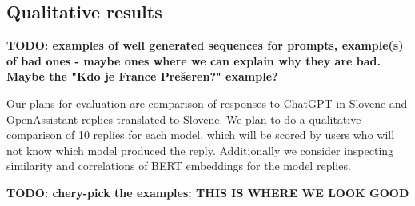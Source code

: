\documentclass[fleqn,moreauthors,10pt]{ds_report}
\begin{document}
            
            
    


    \subsection*{Qualitative results}
    \textbf{TODO: examples of well generated sequences for prompts, example(s) of bad ones - maybe ones where we can explain why they are bad. Maybe the "Kdo je France Prešeren?" example?}

    Our plans for evaluation are comparison of responses to ChatGPT in Slovene and OpenAssistant replies translated to Slovene. We plan to do a qualitative comparison of 10 replies for each model, which will be scored by users who will not know which model produced the reply.
    Additionally we consider inspecting similarity and correlations of BERT embeddings for the model replies.

    \textbf{TODO: chery-pick the examples: THIS IS WHERE WE LOOK GOOD}
\end{document}
